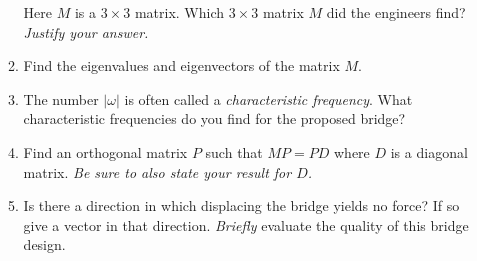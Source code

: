 \begin{enumerate}
\begin{enumerate}
\[\]
Here $M$ is a $3\times 3$ matrix. Which $3\times 3$ matrix  $M$ did the engineers find?
{\itshape Justify your answer.}
\item
Find the eigenvalues and eigenvectors of the matrix $M$.
\item The number $|\omega|$ is often called a {\itshape characteristic frequency}. What characteristic
frequencies do you find for the proposed bridge?
\item Find an orthogonal matrix $P$ such that $MP=PD$ where $D$ is a diagonal matrix.
{\itshape Be sure to also state your result for $D$.}
\item Is there a direction in which displacing the bridge yields no force? If so give a vector in that direction.
{\itshape Briefly} evaluate the quality of this bridge design.
\end{enumerate}



\end{enumerate}
